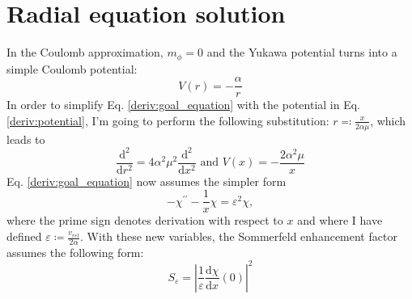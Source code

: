 \section{Radial equation solution}
In the Coulomb approximation, \(m_{\phi }=0 \) and the Yukawa potential turns into a simple Coulomb potential:
\begin{equation}\label{deriv:potential}
	V(r)=-\frac{\alpha}{r}
\end{equation}
In order to simplify Eq. \eqref{deriv:goal_equation} with the potential in Eq. \eqref{deriv:potential}, I'm going to perform the following substitution: \(r \eqqcolon \frac{x}{2\alpha \mu } \), which leads to
\begin{equation}
	\frac{\mathrm{d}^2}{\mathrm{d}r^2} = 4 \alpha ^2 \mu ^2 \frac{\mathrm{d}^2}{\mathrm{d}x^2} \text{ and } V(x) = - \frac{2\alpha ^2\mu}{x} 
\end{equation}
Eq. \eqref{deriv:goal_equation} now assumes the simpler form
\begin{equation}\label{deriv:final_equation}
	- \chi^{\prime\prime} - \frac{1}{x} \chi = \varepsilon ^2 \chi,
\end{equation}
where the prime sign denotes derivation with respect to \(x\) and where I have defined \(\varepsilon \coloneqq \frac{v_{rel} }{2 \alpha }\). With these new variables, the Sommerfeld enhancement factor assumes the following form:
\begin{equation}
	S_{\varepsilon } = \left\vert \frac{1}{\varepsilon } \frac{\mathrm{d}\chi }{\mathrm{d}x} (0) \right\vert^2
\end{equation}


